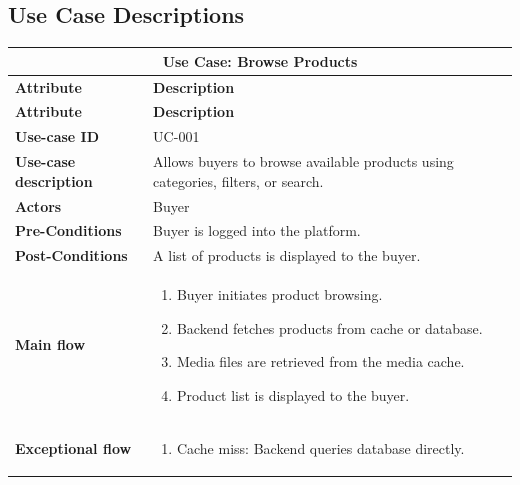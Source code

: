 \documentclass[12pt]{report}
\begin{document}
\begin{appendices}
	\chapter{Use Case Descriptions}

	\begin{longtable}[H]{|l|p{9cm}||}
		\hline
		\multicolumn{2}{|c||}{\textbf{Use Case: Browse Products}}                                                        \\
		\hline
		\textbf{Attribute}            & \textbf{Description}                                                             \\
		\hline
		\endfirsthead
		\hline
		\textbf{Attribute}            & \textbf{Description}                                                             \\
		\hline
		\endhead
		\textbf{Use-case ID}          & UC-001                                                                           \\
		\hline
		\textbf{Use-case description} & Allows buyers to browse available products using categories, filters, or search. \\
		\hline
		\textbf{Actors}               & Buyer                                                                            \\
		\hline
		\textbf{Pre-Conditions}       & Buyer is logged into the platform.                                               \\
		\hline
		\textbf{Post-Conditions}      & A list of products is displayed to the buyer.                                    \\
		\hline
		\textbf{Main flow}            & \begin{enumerate}
			                                \item Buyer initiates product browsing.
			                                \item Backend fetches products from cache or database.
			                                \item Media files are retrieved from the media cache.
			                                \item Product list is displayed to the buyer.
		                                \end{enumerate}                            \\
		\hline
		\textbf{Exceptional flow}     & \begin{enumerate}
			                                \item Cache miss: Backend queries database directly.

\end{enumerate}
\end{longtable}
\end{appendices}
\end{document}
